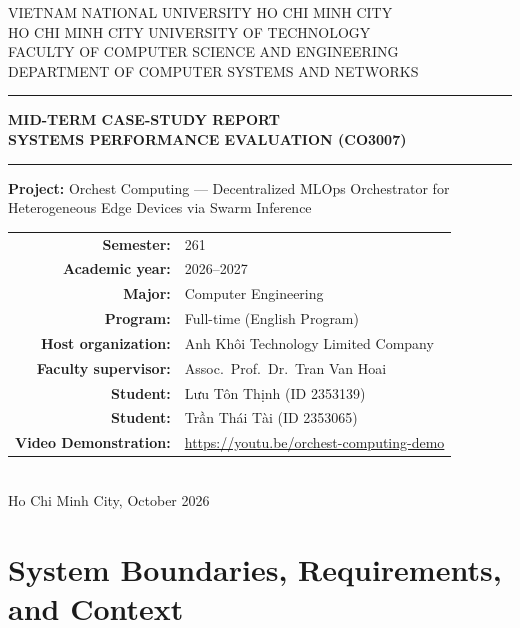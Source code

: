 \documentclass[10pt,a4paper]{article}
\renewcommand{\contentsname}{Contents}
\begin{document}
\begin{titlepage}
\centering
{\large VIETNAM NATIONAL UNIVERSITY HO CHI MINH CITY\\
HO CHI MINH CITY UNIVERSITY OF TECHNOLOGY\\
FACULTY OF COMPUTER SCIENCE AND ENGINEERING\\
DEPARTMENT OF COMPUTER SYSTEMS AND NETWORKS}\\[1.5cm]
\hrule\vspace{0.6cm}
{\Huge\bfseries MID-TERM CASE-STUDY REPORT}\\[0.4cm]
{\LARGE\bfseries SYSTEMS PERFORMANCE EVALUATION (CO3007)}\\[0.6cm]
\hrule\vspace{1cm}
{\large\textbf{Project:} Orchest Computing --- Decentralized MLOps Orchestrator for Heterogeneous Edge Devices via Swarm Inference}\\[1.2cm]
\begin{tabular}{rl}
\textbf{Semester:} & 261 \\
\textbf{Academic year:} & 2026--2027 \\
\textbf{Major:} & Computer Engineering \\
\textbf{Program:} & Full-time (English Program) \\
\textbf{Host organization:} & Anh Khôi Technology Limited Company \\
\textbf{Faculty supervisor:} & Assoc.\ Prof.\ Dr.\ Tran Van Hoai \\
\textbf{Student:} & Lưu Tôn Thịnh \quad (ID 2353139) \\
\textbf{Student:} & Trần Thái Tài \quad (ID 2353065) \\
\textbf{Video Demonstration:} & \url{https://youtu.be/orchest-computing-demo} \\
\end{tabular}\\[2cm]
{\large Ho Chi Minh City, October 2026}
\end{titlepage}

\renewcommand{\contentsname}{Table of Contents}
\tableofcontents
\newpage

\section{System Boundaries, Requirements, and Context}
\end{document}
